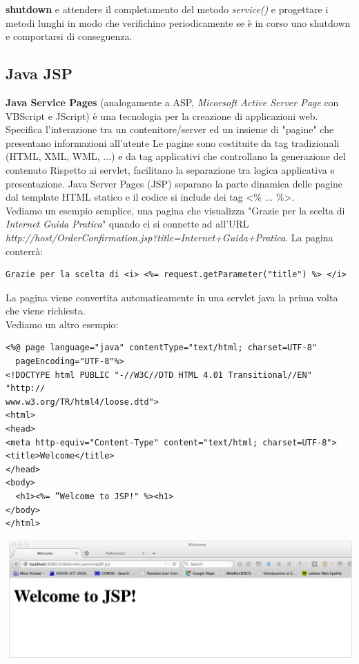 \message{ !name(sd.tex)}\documentclass[a4paper,12pt, oneside]{book}
\begin{document}
\textbf{shutdown} e attendere il completamento del metodo \textit{service()} e progettare i metodi lunghi in modo che verifichino periodicamente
se è in corso uno shutdown e comportarsi di conseguenza.
\subsection{Java JSP}
\textbf{Java Service Pages} (analogamente a ASP, \textit{Micorsoft Active Server Page} con VBScript e JScript) è una tecnologia per la creazione di applicazioni web. Specifica l'interazione tra un contenitore/server ed un insieme di "pagine" che presentano informazioni all’utente
Le pagine sono costituite da tag tradizionali (HTML, XML,
WML, ...) e da tag applicativi che controllano la generazione
del contenuto Rispetto ai servlet, facilitano la separazione tra logica applicativa e presentazione. Java Server Pages (JSP) separano la parte dinamica delle pagine dal template HTML statico e il codice si include dei tag <\% ... \%>.\\ Vediamo un esempio semplice, una pagina che visualizza "Grazie per la scelta di \textit{Internet Guida Pratica}" quando ci si connette ad  all'URL \textit{http://host/OrderConfirmation.jsp?title=Internet+Guida+Pratica}. La pagina conterrà:
\begin{verbatim}
Grazie per la scelta di <i> <%= request.getParameter("title") %> </i>
\end{verbatim} 
La pagina viene convertita automaticamente in una servlet java la prima volta che viene richiesta.\\
Vediamo un altro esempio:
\begin{verbatim}
<%@ page language="java" contentType="text/html; charset=UTF-8"
  pageEncoding="UTF-8"%>
<!DOCTYPE html PUBLIC "-//W3C//DTD HTML 4.01 Transitional//EN" "http://
www.w3.org/TR/html4/loose.dtd">
<html>
<head>
<meta http-equiv="Content-Type" content="text/html; charset=UTF-8">
<title>Welcome</title>
</head>
<body>
  <h1><%= ”Welcome to JSP!" %><h1>
</body>
</html>
\end{verbatim}
\begin{center}
	\includegraphics[scale=0.7]{img/jsp.png}
\end{center}
\end{document}
